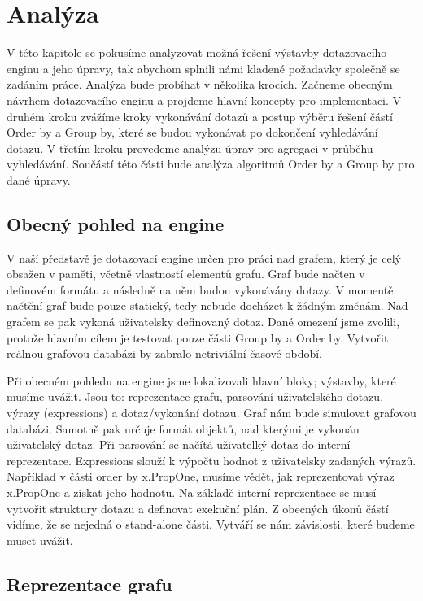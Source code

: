 

\chapter{Analýza}

V této kapitole se pokusíme analyzovat možná řešení výstavby dotazovacího enginu a jeho úpravy, tak abychom splnili námi kladené požadavky společně se zadáním práce.
Analýza bude probíhat v několika krocích.
Začneme obecným návrhem dotazovacího enginu a projdeme hlavní koncepty pro implementaci.
V druhém kroku zvážíme kroky vykonávání dotazů a postup výběru řešení částí Order by a Group by, které se budou vykonávat po dokončení vyhledávání dotazu.
V třetím kroku provedeme analýzu úprav pro agregaci v průběhu vyhledávání. 
Součástí této části bude analýza algoritmů Order by a Group by pro dané úpravy. 

\section{Obecný pohled na engine}

V naší představě je dotazovací engine určen pro práci nad grafem, který je celý obsažen v paměti, včetně vlastností elementů grafu.
Graf bude načten v definovém formátu a následně na něm budou vykonávány dotazy.
V momentě načtění graf bude pouze statický, tedy nebude docházet k žádným změnám.
Nad grafem se pak vykoná uživatelsky definovaný dotaz.
Dané omezení jsme zvolili, protože hlavním cílem je testovat pouze části Group by a Order by.
Vytvořit reálnou grafovou databázi by zabralo netriviální časové období.

Při obecném pohledu na engine jsme lokalizovali hlavní bloky; výstavby, které musíme uvážit.
Jsou to: reprezentace grafu, parsování uživatelského dotazu, výrazy (expressions) a dotaz/vykonání dotazu.
Graf nám bude simulovat grafovou databázi. 
Samotně pak určuje formát objektů, nad kterými je vykonán uživatelský dotaz.
Při parsování se načítá uživatelký dotaz do interní reprezentace.
Expressions slouží k výpočtu hodnot z uživatelsky zadaných výrazů.
Například v části order by x.PropOne, musíme vědět, jak reprezentovat výraz x.PropOne a získat jeho hodnotu. 
Na základě interní reprezentace se musí vytvořit struktury dotazu a definovat exekuční plán. 
Z obecných úkonů částí vidíme, že se nejedná o stand-alone části.
Vytváří se nám závislosti, které budeme muset uvážit.

\section{Reprezentace grafu}

